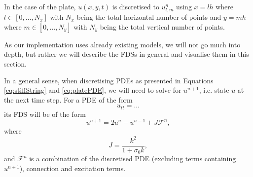 \documentclass{article}
\begin{document}
In the case of the plate, $u(x,y,t)$ is discretised to $u_{l,m}^n$ using $x = lh$ where $l \in [0,\hdots, N_x]$ with $N_x$ being the total horizontal number of points and $y = mh$ where $m \in [0,\hdots,N_y]$ with $N_y$ being the total vertical number of points.

As our implementation uses already existing models, we will not go much into depth, but rather we will describe the FDSs in general and visualise them in this section.

In a general sense, when discretising PDEs as presented in Equations \eqref{eq:stiffString} and \eqref{eq:platePDE}, we will need to solve for $u^{n+1}$, i.e. state $u$ at the next time step. For a PDE of the form 
\begin{equation}
u_{tt} = \hdots \label{eq:PDEform}
\end{equation}
its FDS will be of the form
\begin{equation}\label{eq:FDSform}
    u^{n+1} = 2u^n-u^{n-1} + J\mathcal{F}^n,
\end{equation}
where
\begin{equation}\label{eq:J}
    J = \frac{k^2}{1+\sigma_0k}, 
\end{equation}
and $\mathcal{F}^n$ is a combination of the discretised PDE (excluding terms containing $u^{n+1}$), connection and excitation terms.  
\end{document}
